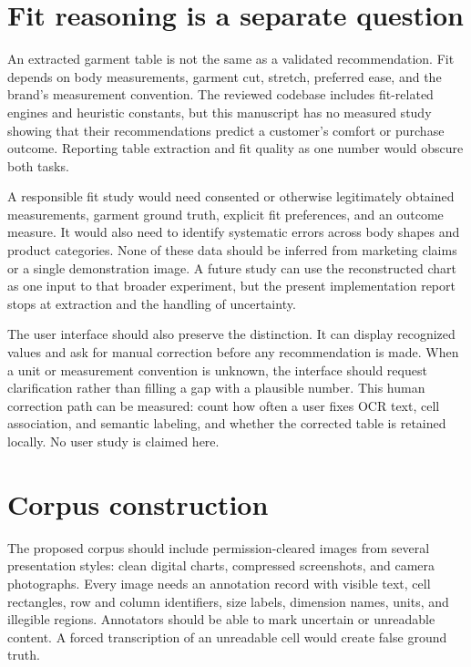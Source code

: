 \documentclass[10pt,letterpaper]{article}
\begin{document}
\section{Fit reasoning is a separate question}

An extracted garment table is not the same as a validated recommendation. Fit depends on body measurements, garment cut, stretch, preferred ease, and the brand's measurement convention. The reviewed codebase includes fit-related engines and heuristic constants, but this manuscript has no measured study showing that their recommendations predict a customer's comfort or purchase outcome. Reporting table extraction and fit quality as one number would obscure both tasks.

A responsible fit study would need consented or otherwise legitimately obtained measurements, garment ground truth, explicit fit preferences, and an outcome measure. It would also need to identify systematic errors across body shapes and product categories. None of these data should be inferred from marketing claims or a single demonstration image. A future study can use the reconstructed chart as one input to that broader experiment, but the present implementation report stops at extraction and the handling of uncertainty.

The user interface should also preserve the distinction. It can display recognized values and ask for manual correction before any recommendation is made. When a unit or measurement convention is unknown, the interface should request clarification rather than filling a gap with a plausible number. This human correction path can be measured: count how often a user fixes OCR text, cell association, and semantic labeling, and whether the corrected table is retained locally. No user study is claimed here.

\section{Corpus construction}

The proposed corpus should include permission-cleared images from several presentation styles: clean digital charts, compressed screenshots, and camera photographs. Every image needs an annotation record with visible text, cell rectangles, row and column identifiers, size labels, dimension names, units, and illegible regions. Annotators should be able to mark uncertain or unreadable content. A forced transcription of an unreadable cell would create false ground truth.
\end{document}
